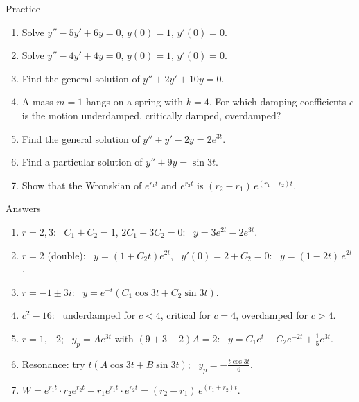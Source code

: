 \documentclass[10pt]{wosm-slides}
\begin{document}
\begin{frame}{Practice}
  \small
  \begin{enumerate}
    \item Solve $y'' - 5y' + 6y = 0$, $y(0) = 1$, $y'(0) = 0$.
    \item Solve $y'' - 4y' + 4y = 0$, $y(0) = 1$, $y'(0) = 0$.
    \item Find the general solution of $y'' + 2y' + 10y = 0$.
    \item A mass $m = 1$ hangs on a spring with $k = 4$. For which damping coefficients $c$ is the motion
      underdamped, critically damped, overdamped?
    \item Find the general solution of $y'' + y' - 2y = 2e^{3t}$.
    \item Find a particular solution of $y'' + 9y = \sin 3t$.
    \item Show that the Wronskian of $e^{r_1 t}$ and $e^{r_2 t}$ is $(r_2 - r_1)\, e^{(r_1 + r_2)t}$.
  \end{enumerate}
\end{frame}

\begin{frame}{Answers}
  \small
  \begin{enumerate}
    \item $r = 2, 3$: \ $C_1 + C_2 = 1$, $2C_1 + 3C_2 = 0$: \ $y = 3e^{2t} - 2e^{3t}$.
    \item $r = 2$ (double): \ $y = (1 + C_2 t)e^{2t}$, \ $y'(0) = 2 + C_2 = 0$: \ $y = (1 - 2t)\, e^{2t}$.
    \item $r = -1 \pm 3i$: \ $y = e^{-t}(C_1\cos 3t + C_2\sin 3t)$.
    \item $c^2 - 16$: \ underdamped for $c < 4$, critical for $c = 4$, overdamped for $c > 4$.
    \item $r = 1, -2$; \ $y_p = Ae^{3t}$ with $(9 + 3 - 2)A = 2$: \ $y = C_1 e^t + C_2 e^{-2t} + \frac15 e^{3t}$.
    \item Resonance: try $t(A\cos 3t + B\sin 3t)$; \ $y_p = -\frac{t\cos 3t}{6}$.
    \item $W = e^{r_1 t} \cdot r_2 e^{r_2 t} - r_1 e^{r_1 t} \cdot e^{r_2 t} = (r_2 - r_1)\, e^{(r_1 + r_2)t}$.
  \end{enumerate}
\end{frame}

\end{document}

